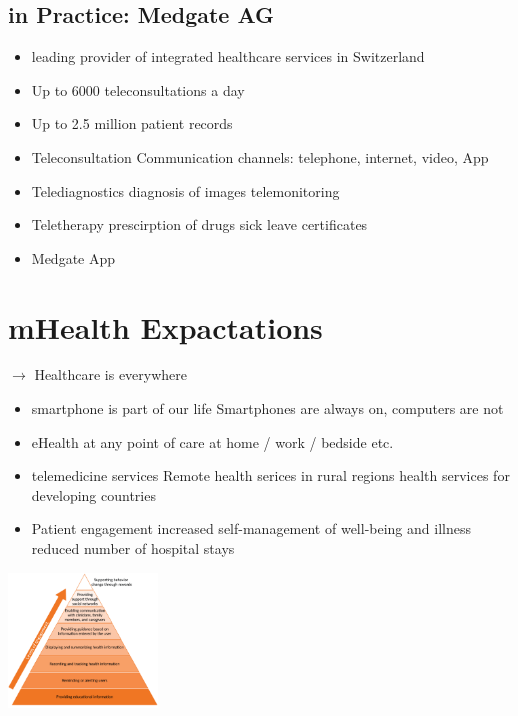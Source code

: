 \documentclass{report}
\newenvironment{Figure}
	{\par\medskip\noindent\minipage{\linewidth}}
	{\endminipage\par\medskip}
\theoremstyle{definition}
\theoremstyle{example}
\begin{document}
\subsection{in Practice: Medgate AG}
\begin{itemize}
   \item leading provider of integrated healthcare services in Switzerland
   \item Up to 6000 teleconsultations a day
   \item Up to 2.5 million patient records
   \item Teleconsultation
   \subitem Communication channels: telephone, internet, video, App 
   \item Telediagnostics
   \subitem diagnosis of images
   \subitem telemonitoring 
   \item Teletherapy
   \subitem prescirption of drugs
   \subitem sick leave certificates 
   \item Medgate App
\end{itemize}

\section{mHealth Expactations}
$\rightarrow$ Healthcare is everywhere

\begin{itemize}
   \item smartphone is part of our life
   \subitem Smartphones are always on, computers are not 
   \item eHealth at any point of care
   \subitem at home / work / bedside etc. 
   \item telemedicine services
   \subitem Remote health serices in rural regions
   \subitem health services for developing countries 
   \item Patient engagement
   \subitem increased self-management of well-being and illness
   \subitem reduced number of hospital stays 
\end{itemize}

\begin{Figure}
   \centering
    \includegraphics[width=150px]{img/EngagementApps.png}
        \label{fig:Patient Engangement using Apps}
\end{Figure}
\end{document}
